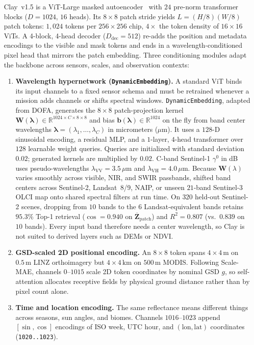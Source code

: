 Clay~v1.5 is a ViT-Large masked autoencoder~\cite{dosovitskiy2021vit} with $24$ pre-norm transformer blocks ($D=1024$, $16$ heads). Its $8\times 8$ patch stride yields $L = (H/8)(W/8)$ patch tokens: $1{,}024$ tokens per $256\times 256$ chip, $4\times$ the token density of $16\times 16$ ViTs. A 4-block, 4-head decoder ($D_{\mathrm{dec}}=512$) re-adds the position and metadata encodings to the visible and mask tokens and ends in a wavelength-conditioned pixel head that mirrors the patch embedding. Three conditioning modules adapt the backbone across sensors, scales, and observation contexts:
\begin{enumerate}
  \item \textbf{Wavelength hypernetwork (\texttt{Dynamic\-Embedding}).} A standard ViT binds its input channels to a fixed sensor schema and must be retrained whenever a mission adds channels or shifts spectral windows. \texttt{Dynamic\-Embedding}, adapted from DOFA, generates the $8\times 8$ patch-projection kernel $\bm{W}(\bm{\lambda}) \in \mathbb{R}^{1024 \times C \times 8 \times 8}$ and bias $\bm{b}(\bm{\lambda}) \in \mathbb{R}^{1024}$ on the fly from band center wavelengths $\bm{\lambda} = (\lambda_1,\dots,\lambda_C)$ in micrometers ($\mu\text{m}$). It uses a $128\text{-D}$ sinusoidal encoding, a residual MLP, and a $1$-layer, $4$-head transformer over $128$ learnable weight queries. Queries are initialized with standard deviation $0.02$; generated kernels are multiplied by $0.02$. C-band Sentinel-1 $\gamma^0$ in dB uses pseudo-wavelengths $\lambda_{\mathrm{VV}}=3.5\,\mu\text{m}$ and $\lambda_{\mathrm{VH}}=4.0\,\mu\text{m}$. Because $\bm{W}(\lambda)$ varies smoothly across visible, NIR, and SWIR passbands, shifted band centers across Sentinel-2, Landsat~8/9, NAIP, or unseen $21$-band Sentinel-3 OLCI map onto shared spectral filters at run time. On $320$ held-out Sentinel-2 scenes, dropping from $10$ bands to the $6$ Landsat-equivalent bands retains $95.3\%$ Top-1 retrieval ($\cos=0.940$ on $\overline{\bm{Z}}_{\mathrm{patch}}$) and $R^2=0.807$ (vs.\ $0.839$ on $10$ bands). Every input band therefore needs a center wavelength, so Clay is not suited to derived layers such as DEMs or NDVI.
  \item \textbf{GSD-scaled 2D positional encoding.} An $8\times 8$ token spans $4\times 4\,\text{m}$ on $0.5\,\text{m}$ LINZ orthoimagery but $4\times 4\,\text{km}$ on $500\,\text{m}$ MODIS. Following Scale-MAE, channels $0\text{--}1015$ scale 2D token coordinates by nominal GSD $g$, so self-attention allocates receptive fields by physical ground distance rather than by pixel count alone.
  \item \textbf{Time and location encoding.} The same reflectance means different things across seasons, sun angles, and biomes. Channels $1016\text{--}1023$ append $[\sin,\cos]$ encodings of ISO week, UTC hour, and $(\text{lon},\text{lat})$ coordinates (\texttt{1020..1023}).
\end{enumerate}

